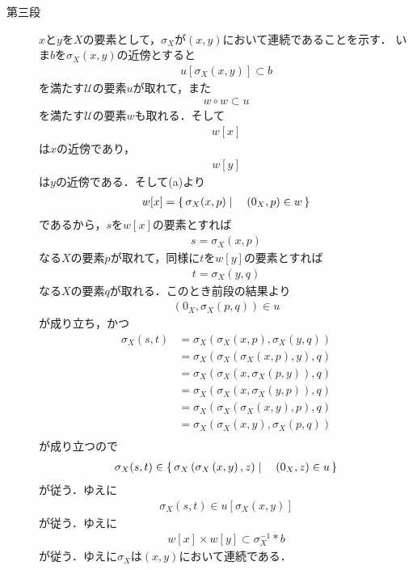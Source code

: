 \begin{sketch}
\begin{description}
			\item[第三段] $x$と$y$を$X$の要素として，$\sigma_X$が$(x,y)$において連続であることを示す．
				いま$b$を$\sigma_X\left(x,y\right)$の近傍とすると
				\begin{align}
					u\left[\sigma_X(x,y)\right] \subset b
				\end{align}
				を満たす$\mathscr{U}$の要素$u$が取れて，また
				\begin{align}
					w \circ w \subset u
				\end{align}
				を満たす$\mathscr{U}$の要素$w$も取れる．そして
				\begin{align}
					w[x]
				\end{align}
				は$x$の近傍であり，
				\begin{align}
					w[y]
				\end{align}
				は$y$の近傍である．そして(a)より
				\begin{align}
					w[x] = \left\{\, \sigma_X(x,p) \mid \quad (0_X,p) \in w\, \right\}
				\end{align}
				であるから，$s$を$w[x]$の要素とすれば
				\begin{align}
					s = \sigma_X(x,p)
				\end{align}
				なる$X$の要素$p$が取れて，同様に$t$を$w[y]$の要素とすれば
				\begin{align}
					t = \sigma_X(y,q)
				\end{align}
				なる$X$の要素$q$が取れる．このとき前段の結果より
				\begin{align}
					\left(0_X,\sigma_X\left(p,q\right)\right) \in u
				\end{align}
				が成り立ち，かつ
				\begin{align}
					\sigma_X(s,t) &= \sigma_X\left(\sigma_X\left(x,p\right),\sigma_X\left(y,q\right)\right) \\
					&= \sigma_X\left(\sigma_X\left(\sigma_X\left(x,p\right),y\right),q\right) \\
					&= \sigma_X\left(\sigma_X\left(x,\sigma_X\left(p,y\right)\right),q\right) \\
					&= \sigma_X\left(\sigma_X\left(x,\sigma_X\left(y,p\right)\right),q\right) \\
					&= \sigma_X\left(\sigma_X\left(\sigma_X\left(x,y\right),p\right),q\right) \\
					&= \sigma_X\left(\sigma_X\left(x,y\right),\sigma_X\left(p,q\right)\right) \\
				\end{align}
				が成り立つので
				\begin{align}
					\sigma_X(s,t) \in \left\{\, \sigma_X\left(\sigma_X\left(x,y\right),z\right) \mid \quad (0_X,z) \in u\, \right\}
				\end{align}
				が従う．ゆえに
				\begin{align}
					\sigma_X(s,t) \in u\left[\sigma_X(x,y)\right]
				\end{align}
				が従う．ゆえに
				\begin{align}
					w[x] \times w[y] \subset \sigma_X^{-1} \ast b
				\end{align}
				が従う．ゆえに$\sigma_X$は$(x,y)$において連続である．
				

\end{description}
\end{sketch}
